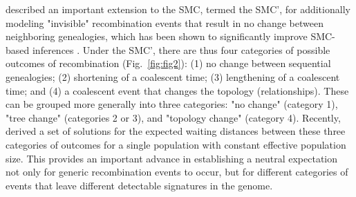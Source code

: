 \documentclass[11pt]{article}
\begin{document}
\cite{marjoram2006fast}
described an important extension to the SMC, termed the SMC', for additionally
modeling "invisible" recombination events that result in no change between 
neighboring genealogies, which has been shown to significantly improve SMC-based 
inferences \citep{wilton2015smc}. Under the SMC', there are thus four categories
of possible outcomes of recombination (Fig.~\ref{fig:fig2}): 
(1) no change between sequential genealogies;
(2) shortening of a coalescent time; (3) lengthening of a coalescent time; 
and (4) a coalescent event that changes the topology (relationships). 
These can be grouped more generally into three categories: 
"no change" (category 1), "tree change" (categories 2 or 3), and "topology change"
(category 4). Recently, \citet{deng_distribution_2021} derived a set of solutions for
the expected waiting distances between these three categories of 
outcomes for a single population with constant effective population size.
This provides an important advance in establishing a neutral expectation not
only for generic recombination events to occur, but for different categories 
of events that leave different detectable signatures in the genome.



\end{document}
